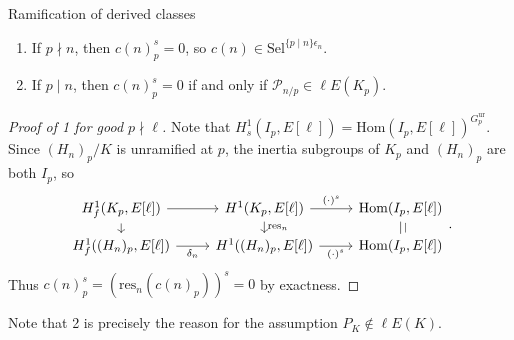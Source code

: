 \documentclass[10pt]{beamer}
\begin{document}
\begin{frame}[t]{Ramification of derived classes}

\begin{lemma}
\begin{enumerate}
\item If $ p \nmid n $, then $ c(n)_p^s = 0 $, so $ c(n) \in \mathrm{Sel}^{\{p \mid n\}\epsilon_n} $.
\item If $ p \mid n $, then $ c(n)_p^s = 0 $ if and only if $ \mathcal{P}_{n / p} \in \ell E(K_p) $.
\end{enumerate}
\end{lemma}

\begin{proof}[Proof of 1 for good $ p \nmid \ell $]
Note that $ H_s^1(I_p, E[\ell]) = \mathrm{Hom}(I_p, E[\ell])^{G_p^{\mathrm{ur}}} $. Since $ (H_n)_p / K $ is unramified at $ p $, the inertia subgroups of $ K_p $ and $ (H_n)_p $ are both $ I_p $, so
$$
\begin{tikzcd}[ampersand replacement=\&, row sep=0.1in]
H_f^1(K_p, E[\ell]) \arrow{r} \arrow{d} \& H^1(K_p, E[\ell]) \arrow{r}{(\cdot)^s} \arrow{d}{\mathrm{res}_n} \& \mathrm{Hom}(I_p, E[\ell]) \arrow[dash]{d}{\mid} \\
H_f^1((H_n)_p, E[\ell]) \arrow{r}[swap]{\delta_n} \& H^1((H_n)_p, E[\ell]) \arrow{r}[swap]{(\cdot)^s} \& \mathrm{Hom}(I_p, E[\ell])
\end{tikzcd}.
$$
Thus $ c(n)_p^s = (\mathrm{res}_n(c(n)_p))^s = 0 $ by exactness.
\end{proof}

\vspace{0.5cm} Note that 2 is precisely the reason for the assumption $ P_K \notin \ell E(K) $.

\end{frame}
\end{document}
